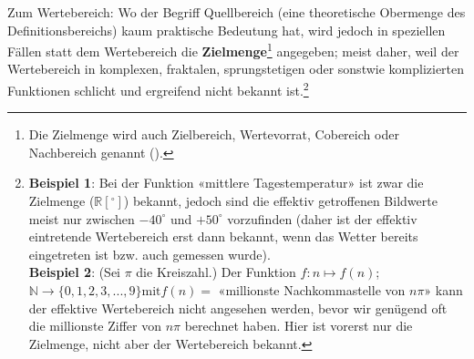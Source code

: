 \begin{bemerkung}{}{}
  Zum Wertebereich: Wo der Begriff Quellbereich (eine theoretische Obermenge
  des Definitionsbereichs) kaum praktische Bedeutung hat,
  wird jedoch in speziellen Fällen statt dem Wertebereich die
  \textbf{Zielmenge}\footnote{Die Zielmenge
    wird auch Zielbereich, Wertevorrat,
    Cobereich oder Nachbereich
    genannt (\cite{FormelnUndTafeln19}).}
  angegeben; meist daher, weil der
  Wertebereich in komplexen, fraktalen, sprungstetigen oder sonstwie komplizierten Funktionen schlicht
  und ergreifend nicht bekannt ist.\footnote{\textbf{Beispiel 1}: Bei der Funktion
    «mittlere Tagestemperatur» ist zwar die Zielmenge ($\mathbb{R}[{}^\circ]$)
    bekannt, jedoch sind die effektiv getroffenen Bildwerte meist nur
    zwischen $-40^\circ$ und $+50^\circ$ vorzufinden (daher ist der
    effektiv eintretende Wertebereich erst dann bekannt, wenn das Wetter
    bereits eingetreten ist bzw. auch gemessen wurde). \\
    \textbf{Beispiel 2}: (Sei $\pi$ die Kreiszahl.) Der Funktion $f: n\mapsto f(n)$; $\mathbb{N} \rightarrow \{0, 1, 2, 3, ..., 9\} \textrm{mit} f(n) = $
    «millionste Nachkommastelle von $n\pi$»
    kann der effektive Wertebereich nicht
  angesehen werden, bevor wir genügend oft die millionste Ziffer von
  $n\pi$ berechnet haben. Hier ist vorerst nur die Zielmenge, nicht
  aber der Wertebereich bekannt.}
\end{bemerkung}



\newpage


